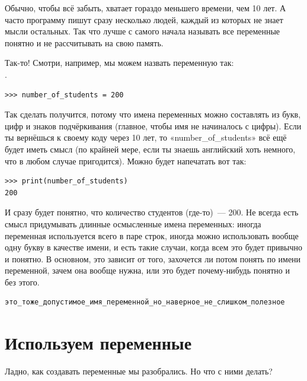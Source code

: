 Обычно, чтобы всё забыть, хватает гораздо меньшего времени, чем 10 лет. А часто программу пишут сразу несколько людей, каждый из которых не знает мысли остальных. Так что лучше с самого начала называть все переменные понятно и не рассчитывать на свою память.

Так-то! Смотри, например, мы можем назвать переменную так:\\.

\begin{listing}
\begin{verbatim}
>>> number_of_students = 200
\end{verbatim}
\end{listing}

Так сделать получится, потому что имена переменных можно составлять из букв, цифр и знаков подчёркивания (главное, чтобы имя не начиналось с цифры). Если ты вернёшься к своему коду через 10 лет, то «number\_of\_students» всё ещё будет иметь смысл (по крайней мере, если ты знаешь английский хоть немного, что в любом случае пригодится). Можно будет напечатать вот так:

\begin{listing}
\begin{verbatim}
>>> print(number_of_students)
200
\end{verbatim}
\end{listing}

И сразу будет понятно, что количество студентов (где-то) — 200. Не всегда есть смысл придумывать длинные осмысленные имена переменных: иногда переменная используется всего в паре строк, иногда можно использовать вообще одну букву в качестве имени, и есть такие случаи, когда всем это будет привычно и понятно. В основном, это зависит от того, захочется ли потом понять по имени переменной, зачем она вообще нужна, или это будет почему-нибудь понятно и без этого.

\begin{listing}
\begin{verbatim}
это_тоже_допустимое_имя_переменной_но_наверное_не_слишком_полезное
\end{verbatim}
\end{listing}

\section{Используем переменные}

Ладно, как создавать переменные мы разобрались. Но что с ними делать?

